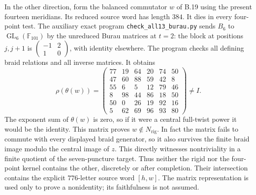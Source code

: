 In the other direction, form the balanced commutator $w$ of
B.19 using the present fourteen meridians.  Its reduced source
word has length $384$.  It dies in every four-point test.
The auxiliary exact program \texttt{check\_all13\_burau.py}
sends $B_6$ to $\operatorname{GL}_6(\mathbb F_{101})$ by the
unreduced Burau matrices at $t=2$: the block at positions
$j,j+1$ is
$\left(\begin{smallmatrix}-1&2\\1&0\end{smallmatrix}\right)$,
with identity elsewhere.  The program checks all defining
braid relations and all inverse matrices.  It obtains
\[
 \rho(\theta(w))=
 \begin{pmatrix}
 77&19&64&20&74&50\\
 47&60&88&59&42&8\\
 55&6&5&12&79&46\\
 8&98&44&86&18&50\\
 50&0&26&19&92&16\\
 5&62&69&96&93&80
 \end{pmatrix}\ne I.
\]
The exponent sum of $\theta(w)$ is zero, so if it were a
central full-twist power it would be the identity.  This
matrix proves $w\notin N_{\mathrm{rig}}$.  In fact the matrix
fails to commute with every displayed braid generator, so
it also survives the finite braid image modulo the central
image of $z$.  This directly witnesses nontriviality in a
finite quotient of the seven-puncture target.
Thus neither the rigid nor the four-point kernel contains
the other, discretely or after completion.  Their intersection
contains the explicit $776$-letter source word $[h,w]$.
The matrix representation is used only to prove a nonidentity;
its faithfulness is not assumed.
